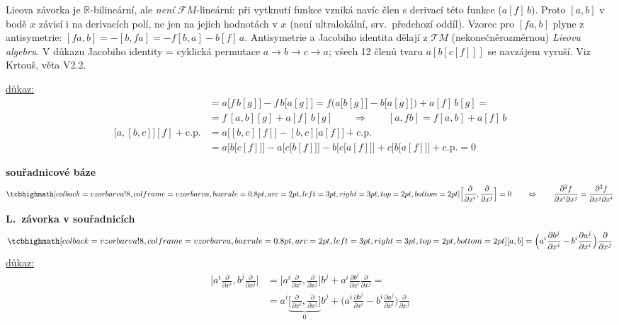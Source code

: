 \begin{vysvetleni}
Lieova závorka je $\mathbb{R}$-bilineární, ale \emph{není} $\mathcal{F}M$-lineární: při vytknutí funkce vzniká navíc člen s derivací této funkce ($a[f]\,b$). Proto $[a,b]$ v bodě $x$ závisí i na derivacích polí, ne jen na jejich hodnotách v $x$ (není ultralokální, srv.\ předchozí oddíl). Vzorec pro $[fa,b]$ plyne z antisymetrie: $[fa,b]=-[b,fa]=-f[b,a]-b[f]\,a$. Antisymetrie a Jacobiho identita dělají z $\mathcal{T}M$ (nekonečně\-rozměrnou) \emph{Lieovu algebru}. V důkazu Jacobiho identity  = cyklická permutace $a\to b\to c\to a$; všech 12 členů tvaru $a[b[c[f]]]$ se navzájem vyruší. Viz Krtouš, věta V2.2.
\end{vysvetleni}

\underline{důkaz:}
\begin{align*}
  [a,fb][g] &= a\big[f\,b[g]\big] - f\,b\big[a[g]\big] = f\Big(a\big[b[g]\big] - b\big[a[g]\big]\Big) + a[f]\,b[g] = \\
  &= f\,[a,b][g] + a[f]\,b[g] \qquad\Rightarrow\qquad [a,fb] = f[a,b] + a[f]\,b \\[4pt]
  \big[a,[b,c]\big][f] + \text{c.p.} &= a\big[[b,c][f]\big] - [b,c]\big[a[f]\big] + \text{c.p.} \\
  &= a\Big[b\big[c[f]\big]\Big] - a\Big[c\big[b[f]\big]\Big] - b\Big[c\big[a[f]\big]\Big] + c\Big[b\big[a[f]\big]\Big] + \text{c.p.} = 0
\end{align*}

\textbf{souřadnicové báze}
\[
  \vzorec{\Big[\frac{\partial}{\partial x^i}, \frac{\partial}{\partial x^j}\Big] = 0}
  \qquad\Leftrightarrow\qquad \frac{\partial^2 f}{\partial x^i\partial x^j} = \frac{\partial^2 f}{\partial x^j\partial x^i}
\]

\textbf{L.\ závorka v souřadnicích}
\[
  \vzorec{[a,b] = \Big(a^i\frac{\partial b^j}{\partial x^i} - b^i\frac{\partial a^j}{\partial x^i}\Big)\frac{\partial}{\partial x^j}}
\]
\underline{důkaz:}
\begin{align*}
  \Big[a^i\frac{\partial}{\partial x^i}, b^j\frac{\partial}{\partial x^j}\Big]
  &= \Big[a^i\frac{\partial}{\partial x^i}, \frac{\partial}{\partial x^j}\Big]b^j + a^i\frac{\partial b^j}{\partial x^i}\frac{\partial}{\partial x^j} = \\
  &= a^i\underbrace{\Big[\frac{\partial}{\partial x^i}, \frac{\partial}{\partial x^j}\Big]}_{0}b^j
   + \Big(a^i\frac{\partial b^j}{\partial x^i} - b^i\frac{\partial a^j}{\partial x^i}\Big)\frac{\partial}{\partial x^j}
\end{align*}

